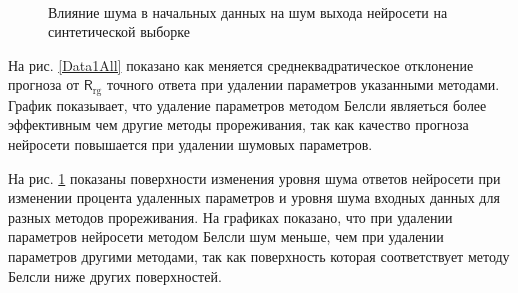 \begin{figure}[h!t]\center
{}
\\
\caption{Влияние шума в начальных данных на шум выхода нейросети на синтетической выборке}
\label{Data1Noise}
\end{figure}

На рис. \ref{Data1All} показано как меняется среднеквадратическое отклонение прогноза от $\mathsf{R}_{\text{rg}}$ точного ответа при удалении параметров указанными методами. График показывает, что удаление параметров методом Белсли являеться более эффективным чем другие методы прореживания, так как качество прогноза нейросети повышается при удалении шумовых параметров.

На рис. \ref{Data1Noise} показаны поверхности изменения уровня шума ответов нейросети при изменении процента удаленных параметров и уровня шума входных данных для разных методов прореживания. На графиках показано, что при удалении параметров нейросети методом Белсли шум меньше, чем при удалении параметров другими методами, так как поверхность которая соответствует методу Белсли ниже других поверхностей.



